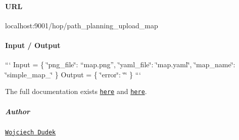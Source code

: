 \paragraph*{U\-R\-L}

{\ttfamily localhost\-:9001/hop/path\-\_\-planning\-\_\-upload\-\_\-map}

\paragraph*{Input / Output}

``` Input = \{ \char`\"{}png\-\_\-file\char`\"{}\-: “map.\-png”, \char`\"{}yaml\-\_\-file\char`\"{}\-: \char`\"{}map.\-yaml\char`\"{}, \char`\"{}map\-\_\-name\char`\"{}\-: \char`\"{}simple\-\_\-map\-\_\char`\"{} \} {\ttfamily  } Output = \{ \char`\"{}error\char`\"{}\-: \char`\"{}\char`\"{} \} ```

The full documentation exists \href{https://github.com/rapp-project/rapp-platform/tree/master/rapp_web_services/services#path-planning-plan-path-2d}{\tt here} and \href{https://github.com/rapp-project/rapp-platform/tree/master/rapp_web_services/services#path-planning-upload-map}{\tt here}.

\subparagraph*{Author}

\href{https://github.com/dudekw}{\tt Wojciech Dudek} 